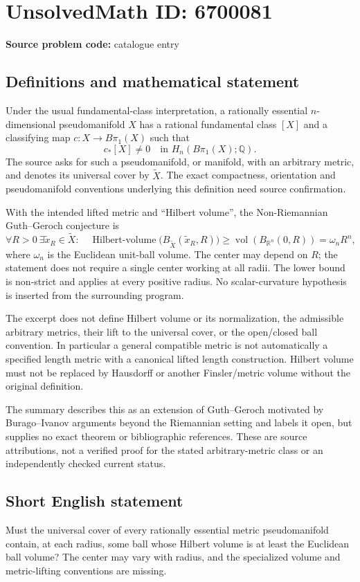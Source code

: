\documentclass[11pt]{article}
\begin{document}
\section*{UnsolvedMath ID: 6700081}
\textbf{Source problem code:} catalogue entry
\subsection{Definitions and mathematical statement}
Under the usual fundamental-class interpretation, a rationally essential \(n\)-dimensional pseudomanifold \(X\) has a rational fundamental class \([X]\) and a classifying map \(c:X\to B\pi_1(X)\) such that
\[
 c_*[X]\ne0\quad\text{in }H_n(B\pi_1(X);\mathbb Q).
\]
The source asks for such a pseudomanifold, or manifold, with an arbitrary metric, and denotes its universal cover by \(\widetilde X\). The exact compactness, orientation and pseudomanifold conventions underlying this definition need source confirmation.

With the intended lifted metric and ``Hilbert volume'', the Non-Riemannian Guth--Geroch conjecture is
\[
 \forall R>0\ \exists\widetilde x_R\in\widetilde X:\quad
 \operatorname{Hilbert\text{-}volume}
 \bigl(B_{\widetilde X}(\widetilde x_R,R)\bigr)
 \ge\operatorname{vol}(B_{\mathbb R^n}(0,R))
 =\omega_nR^n,
\]
where \(\omega_n\) is the Euclidean unit-ball volume. The center may depend on \(R\); the statement does not require a single center working at all radii. The lower bound is non-strict and applies at every positive radius. No scalar-curvature hypothesis is inserted from the surrounding program.

The excerpt does not define Hilbert volume or its normalization, the admissible arbitrary metrics, their lift to the universal cover, or the open/closed ball convention. In particular a general compatible metric is not automatically a specified length metric with a canonical lifted length construction. Hilbert volume must not be replaced by Hausdorff or another Finsler/metric volume without the original definition.

The summary describes this as an extension of Guth--Geroch motivated by Burago--Ivanov arguments beyond the Riemannian setting and labels it open, but supplies no exact theorem or bibliographic references. These are source attributions, not a verified proof for the stated arbitrary-metric class or an independently checked current status.
\subsection{Short English statement}
Must the universal cover of every rationally essential metric pseudomanifold contain, at each radius, some ball whose Hilbert volume is at least the Euclidean ball volume? The center may vary with radius, and the specialized volume and metric-lifting conventions are missing.
\end{document}
